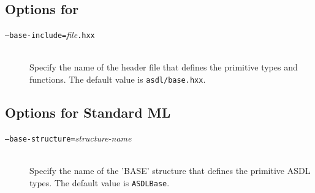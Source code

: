 \subsection*{Options for \Cplusplus}

\begin{description}
  \item[\normalfont\texttt{--base-include=}\textit{file}\texttt{.hxx}] \mbox{}\\
    Specify the name of the \Cplusplus{}header file that defines the primitive \asdl{} types
    and functions.
    The default value is \texttt{asdl/base.hxx}. 
\end{description}%

\subsection*{Options for Standard ML}
\begin{description}
  \item[\normalfont\texttt{--base-structure=}\textit{structure-name}] \mbox{}\\
    Specify the name of the 'BASE' structure that defines the primitive ASDL types.
    The default value is \lstinline[language=SML]!ASDLBase!.
\end{description}%

